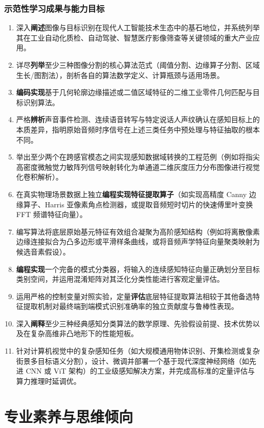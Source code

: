 \subsubsection{示范性学习成果与能力目标}
\begin{enumerate}
    \item 深入\textbf{阐述}图像与目标识别在现代人工智能技术生态中的基石地位，并系统列举其在工业自动化质检、自动驾驶、智慧医疗影像筛查等关键领域的重大产业应用。
    \item 详尽\textbf{列举}至少三种图像分割的核心算法范式（阈值分割、边缘算子分割、区域生长/图割法），剖析各自的算法数学定义、计算瓶颈与适用场景。
    \item \textbf{编码实现}基于几何轮廓边缘描述或二值区域特征的二维工业零件几何匹配与目标识别算法。
    \item 严格\textbf{辨析}声音事件检测、连续语音转写与特定说话人声纹确认在感知目标上的本质差异，指明原始音频时序信号在上述三类任务中预处理与特征抽取的根本不同。
    \item 举出至少两个在跨感官模态之间实现感知数据域转换的工程范例（例如将指尖高密度微触觉力敏阵列信号映射转化为单通道二维灰度压力分布图像进行视觉化卷积解析）。
    \item 在真实物理场景数据上独立\textbf{编程实现特征提取算子}（如实现高精度 Canny 边缘算子、Harris 亚像素角点检测器，或提取音频短时切片的快速傅里叶变换 FFT 频谱特征向量）。
    \item 编写算法将底层原始基元特征有效组合凝聚为高阶感知结构（例如将离散像素边缘连接拟合为凸多边形或平滑样条曲线，或将音频声学特征向量聚类映射为候选音素假设）。
    \item \textbf{编程实现}一个完备的模式分类器，将输入的连续感知特征向量正确划分至目标类别空间，并运用混淆矩阵对其泛化分类性能进行客观定量评估。
    \item 运用严格的控制变量对照实验，定量\textbf{评估}底层特征提取算法相较于其他备选特征提取机制对最终端到端模式识别准确率的独立贡献度与鲁棒性表现。
    \item 深入\textbf{阐释}至少三种经典感知分类算法的数学原理、先验假设前提、技术优势以及在复杂高维非凸地形下的性能短板。
    \item 针对计算机视觉中的复杂感知任务（如大规模通用物体识别、开集检测或复杂街景多目标语义分割），设计、微调并部署一个基于现代深度神经网络（如先进 CNN 或 ViT 架构）的工业级感知解决方案，并完成高标准的定量评估与算力推理时延调优。
\end{enumerate}

\section{专业素养与思维倾向}

